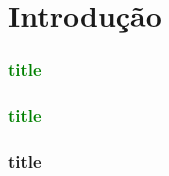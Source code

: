 \section{Introdução}
\begin{frame}
\frametitle{\textcolor{green}{title}}
\end{frame}
\begin{frame}
\frametitle{\textcolor{green}{title}}
\end{frame}
\begin{frame}
\frametitle{title}
\end{frame}
